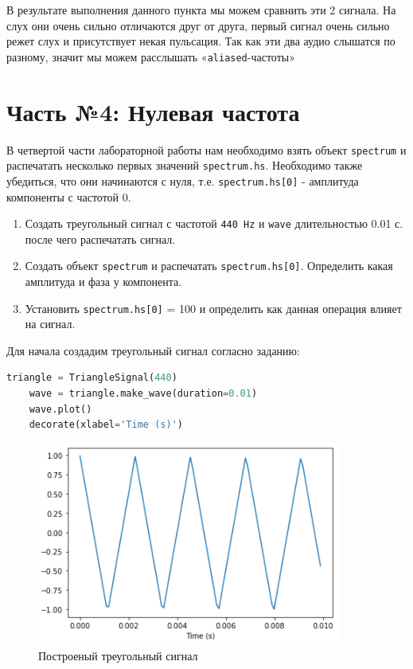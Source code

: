 \documentclass[a4paper]{article}
\begin{document}
            В результате выполнения данного пункта мы можем сравнить эти 2 сигнала. На слух они очень сильно отличаются друг от друга, первый сигнал очень сильно режет слух и присутствует некая пульсация. Так как эти два аудио слышатся по разному, значит мы можем расслышать «\texttt{aliased}-частоты»
            
    \newpage
        \section{Часть №4: Нулевая частота}
            В четвертой части лабораторной работы нам необходимо взять объект \texttt{spectrum} и распечатать несколько первых значений \texttt{spectrum.hs}. Необходимо также убедиться, что они начинаются с нуля, т.е. \texttt{spectrum.hs[0]} - амплитуда компоненты с частотой 0.
            
                \begin{enumerate}
                    \item Создать треугольный сигнал с частотой \texttt{440 Hz} и \texttt{wave} длительностью 0.01 с. после чего распечатать сигнал.
                    \item Создать объект \texttt{spectrum} и распечатать \texttt{spectrum.hs[0]}. Определить какая амплитуда и фаза у компонента.
                    \item Установить \texttt{spectrum.hs[0]} = 100 и определить как данная операция влияет на сигнал.
                \end{enumerate}
            
            Для начала создадим треугольный сигнал согласно заданию:
            
\begin{lstlisting}[language=Python, caption= Построение треугольного сигнала]
    triangle = TriangleSignal(440)
    wave = triangle.make_wave(duration=0.01)
    wave.plot()
    decorate(xlabel='Time (s)')
\end{lstlisting}               
            
            \begin{figure}[H]
                \centering
                \includegraphics[width=\textwidth]{ex_4_triangle_signal.png}
                \caption{Построеный треугольный сигнал}
                \label{fig:ex_4_triangle_signal}
            \end{figure}
            
\end{document}
